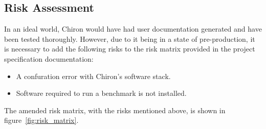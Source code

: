 \documentclass[12pt,a4paper]{article}
\begin{document}
        \subsection{Risk Assessment}
        \label{sub:risk_assessment}

            In an ideal world, Chiron would have had user documentation generated and have been tested thoroughly. However, due to it being in a state of pre-production, it is necessary to add the following risks to the risk matrix provided in the project specification documentation:

            \begin{itemize}
                \item A confuration error with Chiron's software stack.
                \item Software required to run a benchmark is not installed.
            \end{itemize}

            The amended risk matrix, with the risks mentioned above, is shown in figure~\ref{fig:risk_matrix}.
\end{document}

